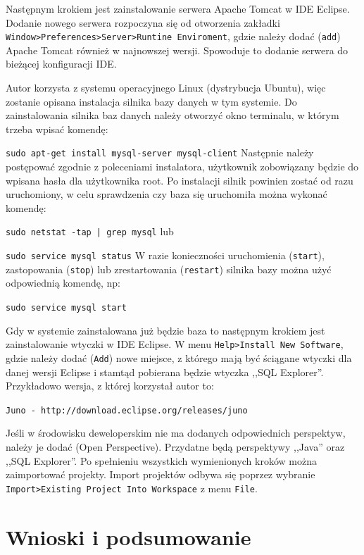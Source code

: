 \documentclass[eng,printmode,oneside]{mgr}
\begin{document}
Następnym krokiem jest zainstalowanie serwera Apache Tomcat w IDE Eclipse.
Dodanie nowego serwera rozpoczyna się od otworzenia zakładki
\texttt{Window>Preferences>Server>Runtine Enviroment}, gdzie należy dodać
(\texttt{add}) Apache Tomcat również w najnowszej wersji. Spowoduje to
dodanie serwera do bieżącej konfiguracji IDE.

Autor korzysta z systemu operacyjnego Linux (dystrybucja Ubuntu), więc zostanie
opisana instalacja silnika bazy danych w tym systemie. Do zainstalowania silnika
baz danych należy otworzyć okno terminalu, w którym trzeba wpisać komendę:

\texttt{sudo apt-get install mysql-server mysql-client} 
\newline Następnie należy postępować zgodnie z poleceniami instalatora,
użytkownik zobowiązany będzie do wpisana hasła dla użytkownika root. Po instalacji
silnik powinien zostać od razu uruchomiony, w celu sprawdzenia czy baza się
uruchomiła można wykonać komendę:

\texttt{sudo netstat -tap | grep mysql}
\newline lub

\texttt{sudo service mysql status}
\newline W razie konieczności uruchomienia (\texttt{start}), zastopowania
(\texttt{stop}) lub zrestartowania (\texttt{restart}) silnika bazy można użyć
odpowiednią komendę, np:

\texttt{sudo service mysql start}

Gdy w systemie zainstalowana już będzie baza to następnym krokiem jest
zainstalowanie wtyczki w IDE Eclipse. W menu \texttt{Help>Install New Software},
gdzie należy dodać (\texttt{Add}) nowe miejsce, z którego mają być ściągane
wtyczki dla danej wersji Eclipse i stamtąd pobierana będzie wtyczka ,,SQL Explorer''.
Przykładowo wersja, z której korzystał autor to:

\texttt{Juno - http://download.eclipse.org/releases/juno}

Jeśli w środowisku deweloperskim nie ma dodanych odpowiednich perspektyw,
należy je dodać (Open Perspective). Przydatne będą perspektywy
,,Java'' oraz ,,SQL Explorer''.
Po spełnieniu wszystkich wymienionych kroków można zaimportować
projekty. Import projektów odbywa się poprzez wybranie
\texttt{Import>Existing Project Into Workspace} z menu \texttt{File}.

\chapter{Wnioski i podsumowanie}
\end{document}
